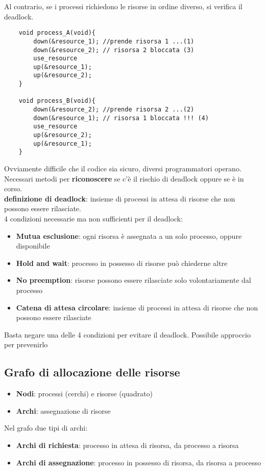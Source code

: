 \documentclass{article}
\begin{document}
Al contrario, se i processi richiedono le risorse in ordine diverso, si verifica il deadlock.
\begin{lstlisting}
    void process_A(void){
        down(&resource_1); //prende risorsa 1 ...(1)
        down(&resource_2); // risorsa 2 bloccata (3)
        use_resource
        up(&resource_1);
        up(&resource_2);
    }
    
    void process_B(void){
        down(&resource_2); //prende risorsa 2 ...(2)
        down(&resource_1); // risorsa 1 bloccata !!! (4)
        use_resource
        up(&resource_2);
        up(&resource_1);
    }
\end{lstlisting}
Ovviamente difficile che il codice sia sicuro, diversi programmatori operano.
Necessari metodi per \textbf{riconoscere} se c'è il rischio di deadlock oppure se è in corso.\\
\textbf{definizione di deadlock}: insieme di processi in attesa di risorse che non possono essere rilasciate.\\
4 condizioni necessarie ma non sufficienti per il deadlock:
\begin{itemize}
    \item \textbf{Mutua esclusione}: ogni risorsa è assegnata a un solo processo, oppure disponibile
    \item \textbf{Hold and wait}: processo in possesso di risorse può chiederne altre
    \item \textbf{No preemption}: risorse possono essere rilasciate solo volontariamente dal processo
    \item \textbf{Catena di attesa circolare}: insieme di processi in attesa di risorse che non possono essere rilasciate
\end{itemize}
Basta negare una delle 4 condizioni per evitare il deadlock. Possibile approccio per prevenirlo\\

\subsection{Grafo di allocazione delle risorse}
\begin{itemize}
    \item \textbf{Nodi}: processi (cerchi) e risorse (quadrato)
    \item \textbf{Archi}: assegnazione di risorse
\end{itemize}
Nel grafo due tipi di archi:
\begin{itemize}
    \item \textbf{Archi di richiesta}: processo in attesa di risorsa, da processo a risorsa
    \item \textbf{Archi di assegnazione}: processo in possesso di risorsa, da risorsa a processo
\end{itemize}
\end{document}
